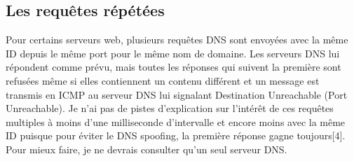 \documentclass[conference]{IEEEtran}
\begin{document}
\subsection{Les requêtes répétées}

Pour certains serveurs web, plusieurs requêtes DNS sont envoyées avec la même ID depuis le même port pour le même nom de domaine. Les serveurs DNS lui répondent comme prévu, mais toutes les réponses qui suivent la première sont refusées même si elles contiennent un contenu différent et un message est transmis en ICMP au serveur DNS lui signalant Destination Unreachable (Port Unreachable). Je n'ai pas de pistes d'explication sur l'intérêt de ces requêtes multiples à moins d'une milliseconde d'intervalle et encore moins avec la même ID puisque pour éviter le DNS spoofing, la première réponse gagne toujours[4]. Pour mieux faire, je ne devrais consulter qu'un seul serveur DNS.
\end{document}
